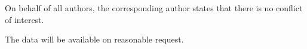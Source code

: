 \documentclass[11pt]{amsart}
\numberwithin{equation}{section}
\theoremstyle{plain}
\theoremstyle{definition}
\theoremstyle{remark}
\begin{document}
On behalf of all authors, the corresponding author states that there is no conflict of interest. 
\medskip

The data will be available on reasonable request.





\end{document}
